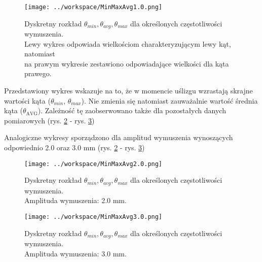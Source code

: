 \documentclass[a4paper,11pt,twoside,openright]{article} %
\begin{document}
\captionsetup{skip=0pt}
\begin{figure}[!h]
\captionsetup{justification=centering}
\begin{center}
\texttt{[image: ../workspace/MinMaxAvg1.0.png]} 
\end{center}
\caption{Dyskretny rozkład $\theta_{min}, \theta_{avg}, \theta_{max}$ dla określonych częstotliwości wymuszenia. \\Lewy wykres odpowiada wielkościom charakteryzującym lewy kąt, natomiast\\ na prawym wykresie zestawiono odpowiadające wielkości dla kąta prawego.}
\label{fig:MinMaxAvg1}
\end{figure} 

\vspace{4mm}
\noindent Przedstawiony wykres wskazuje na to, że w momencie uślizgu wzrastają skrajne wartości kąta ($\theta_{min}$, $\theta_{max}$). Nie zmienia się natomiast zauważalnie wartość średnia kąta ($\theta_{\text{AVG}}$). Zależność tę zaobserwowano także dla pozostałych danych pomiarowych (rys. \ref{fig:MinMaxAvg2} - rys. \ref{fig:MinMaxAvg3})

\newpage
\noindent Analogiczne wykresy sporządzono dla amplitud wymuszenia wynoszących odpowiednio 2.0 oraz 3.0 mm (rys. \ref{fig:MinMaxAvg2} - rys. \ref{fig:MinMaxAvg3})
\captionsetup{skip=0pt}
\begin{figure}[!h]
\captionsetup{justification=centering}
\begin{center}
\texttt{[image: ../workspace/MinMaxAvg2.0.png]} 
\end{center}
\caption{Dyskretny rozkład $\theta_{min}, \theta_{avg}, \theta_{max}$ dla określonych częstotliwości wymuszenia.\\Amplituda wymuszenia: 2.0 mm.}
\label{fig:MinMaxAvg2}
\end{figure} 


\captionsetup{skip=0pt}
\begin{figure}[!h]
\captionsetup{justification=centering}
\begin{center}
\texttt{[image: ../workspace/MinMaxAvg3.0.png]} 
\end{center}
\caption{Dyskretny rozkład $\theta_{min}, \theta_{avg}, \theta_{max}$ dla określonych częstotliwości wymuszenia. \\Amplituda wymuszenia: 3.0 mm.}
\label{fig:MinMaxAvg3}
\end{figure} 

\newpage
\end{document}
